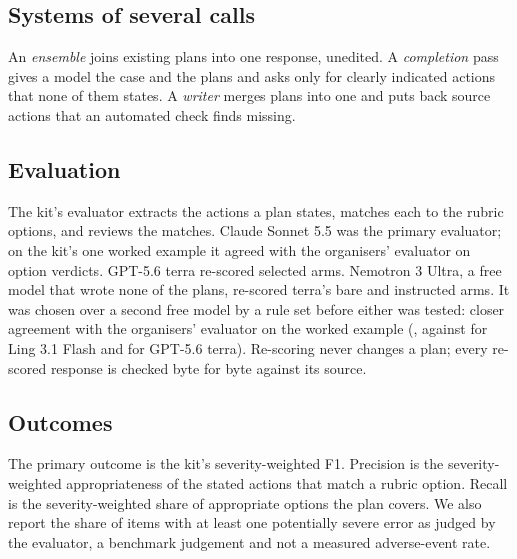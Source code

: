 \documentclass[11pt]{article}
\begin{document}
\subsection{Systems of several calls}
\label{sec:systems-methods}
An \emph{ensemble} joins existing plans into one response, unedited. A \emph{completion} pass gives a
model the case and the plans and asks only for clearly indicated actions that none of them states. A
\emph{writer} merges plans into one and puts back source actions that an automated check finds
missing.

\subsection{Evaluation}
\label{sec:evaluation}
The kit's evaluator extracts the actions a plan states, matches each to the rubric options, and
reviews the matches. Claude Sonnet 5.5 was the primary evaluator; on the kit's one worked example it
agreed with the organisers' evaluator on \judgeAgreeSonnet{} option verdicts. GPT-5.6 terra
re-scored selected arms. Nemotron 3 Ultra, a free model that wrote none of the plans, re-scored
terra's bare and instructed arms. It was chosen over a second free model by a rule set before either
was tested: closer agreement with the organisers' evaluator on the worked example
(\judgeAgreeNemotron{}, against \judgeAgreeLing{} for Ling 3.1 Flash and \judgeAgreeTerra{} for
GPT-5.6 terra). Re-scoring never changes a plan; every re-scored response is checked byte for byte
against its source.

\subsection{Outcomes}
\label{sec:outcomes}
The primary outcome is the kit's severity-weighted F1. Precision is the severity-weighted
appropriateness of the stated actions that match a rubric option. Recall is the severity-weighted
share of appropriate options the plan covers. We also report the share of items with at least one
potentially severe error as judged by the evaluator, a benchmark judgement and not a measured
adverse-event rate.
\end{document}
